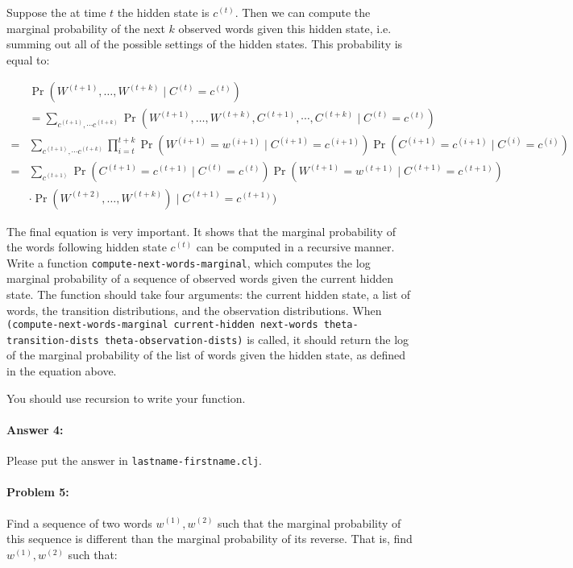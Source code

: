 \documentclass[10pt]{article}
\begin{document}
Suppose the at time $t$ the hidden state is $c^{(t)}$. Then we can
compute the marginal probability of the next $k$ observed words
given this hidden state, i.e. summing out all of the possible settings
of the hidden states. This probability is equal to:

$$\begin{align}
&\Pr(W^{(t+1)},\dots,W^{(t+k)} \mid C^{(t)}=c^{(t)} )\\ 
&= \sum_{c^{(t+1)},\cdots c^{(t+k)}} \Pr(W^{(t+1)},\dots,W^{(t+k)},C^{(t+1)},\cdots,C^{(t+k)} \mid C^{(t)}=c^{(t)} ) \\
=& \sum_{c^{(t+1)},\cdots c^{(t+k)}} \prod_{i=t}^{t+k} \Pr(W^{(i+1)}=w^{(i+1)} \mid C^{(i+1)}=c^{(i+1)}) \Pr(C^{(i+1)} =c^{(i+1)}\mid C^{(i)}=c^{(i)}) \\ 
= & \sum_{c^{(t+1)}} \Pr(C^{(t+1)} =c^{(t+1)}\mid C^{(t)}=c^{(t)}) \Pr(W^{(t+1)} =w^{(t+1)}\mid C^{(t+1)}=c^{(t+1)}) \\
&\cdot \Pr(W^{(t+2)},\dots,W^{(t+k)}) \mid C^{(t+1)}=c^{(t+1)} )
\end{align}$$

The final equation is very important. It shows that the marginal
probability of the words following hidden state $c^{(t)}$ can be
computed in a recursive manner. Write a function
\texttt{compute-next-words-marginal}, which computes the log marginal
probability of a sequence of observed words given the current hidden
state. The function should take four arguments: the current hidden
state, a list of words, the transition distributions, and the
observation distributions. When \texttt{(compute-next-words-marginal
  current-hidden next-words theta-transition-dists
  theta-observation-dists)} is called, it should return the log of the
marginal probability of the list of words given the hidden state, as
defined in the equation above.

You should use recursion to write your function. 

\paragraph{Answer 4:} Please put the answer in
\texttt{lastname-firstname.clj}.

\hrulefill
\paragraph{Problem 5:}
Find a sequence of two words $w^{(1)},w^{(2)}$ such that the marginal
probability of this sequence is different than the marginal
probability of its reverse. That is, find $w^{(1)},w^{(2)}$ such that:
\end{document}
